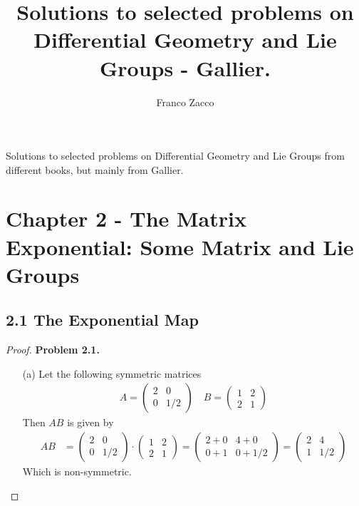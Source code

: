 \documentclass[11pt]{article}
\title{\textbf{
    Solutions to selected problems on Differential Geometry and Lie Groups
    - Gallier.
}}
\author{Franco Zacco}
\date{}
\theoremstyle{definition}
\begin{document}
\maketitle
\thispagestyle{empty}

Solutions to selected problems on Differential Geometry and Lie Groups from
different books, but mainly from Gallier.
\section*{Chapter 2 - The Matrix Exponential: Some Matrix and Lie Groups}
\subsection*{2.1 The Exponential Map}
\begin{proof}{\textbf{Problem 2.1.}}
\begin{itemize}
    \item [(a)] Let the following symmetric matrices
    \begin{align*}
        A = \begin{pmatrix}
            2 & 0\\
            0 & 1/2
        \end{pmatrix}
        \quad
        B = \begin{pmatrix}
            1 & 2\\
            2 & 1
        \end{pmatrix}
    \end{align*}
    Then $AB$ is given by
    \begin{align*}
        AB &= \begin{pmatrix}
            2 & 0\\
            0 & 1/2
        \end{pmatrix}
        \cdot
        \begin{pmatrix}
            1 & 2\\
            2 & 1
        \end{pmatrix}
        = \begin{pmatrix}
            2 + 0 & 4 + 0\\
            0 + 1 & 0 + 1/2
        \end{pmatrix}
        = \begin{pmatrix}
            2 & 4\\
            1 & 1/2
        \end{pmatrix}
    \end{align*}
    Which is non-symmetric.


\end{itemize}
\end{proof}
\end{document}
